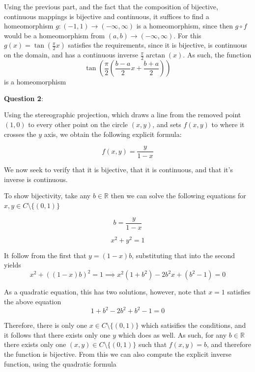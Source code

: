 \documentclass{article} %
\newcommand{\question}[2][]{
  \begin{flushleft}
    \textbf{Question #1}: \textit{#2}

\end{flushleft}}
\begin{document}
\begin{enumerate}

    Using the previous part, and the fact that the composition of
    bijective, continuous mappings is bijective and continuous, it
    suffices to find a homeomorphism $g: (-1, 1) \to (-\infty, \infty)$
    is a homeomorphism, since then $g
    \circ f$ would be a homeomorphism from $(a, b) \to (-\infty,
    \infty)$. For this $g(x) = \tan(\frac{\pi}{2}x)$ satisfies the
    requirements, since it is bijective, is continuous on the domain,
    and has a continuous inverse $\frac{\pi}{2}\arctan(x)$. As such,
    the function
    $$
    \tan\left(\frac{\pi}{2}\left(\frac{b-a}{2}x + \frac{b+a}{2} \right)\right)
    $$
    is a homeomorphism
\end{enumerate}
\question[2]{}

Using the stereographic projection, which draws a line from the
removed point $(1,0)$ to every other point on the circle $(x,y)$, and
sets $f(x,y)$ to where it crosses the $y$ axis, we obtain the
following explicit formula:

$$
f(x,y) = \frac{y}{1-x}
$$

We now seek to verify that it is bijective, that it is continuous,
and that it's inverse is continuous.

To show bijectivity, take any $b \in \mathbb{R}$ then we can solve
the following equations for $x,y \in C\setminus\{(0,1)\}$

\[
  b = \frac{y}{1-x}
\]

\[
  x^2 + y^2 = 1
\]

It follow from the first that $y = (1-x)b$, substituting that into
the second yields
\[
  x^2 + ((1-x)b)^2 = 1 \implies x^2(1+b^2) - 2b^2x + (b^2-1) = 0
\]

As a quadratic equation, this has two solutions, however, note that
$x = 1$ satisfies the above equation
\[
  1+b^2 - 2b^2 + b^2-1 = 0
\]

Therefore, there is only one $x \in C\setminus\{(0,1)\}$ which
satisifies the conditions, and it follows that there exists only one
$y$ which does as well. As such, for any $b\in\mathbb{R}$ there
exists only one $(x,y) \in C\setminus\{(0,1)\}$ such that $f(x,y) =
b$, and therefore the function is bijective. From this we can also
compute the explicit inverse function, using the quadratic formula
\end{document}
